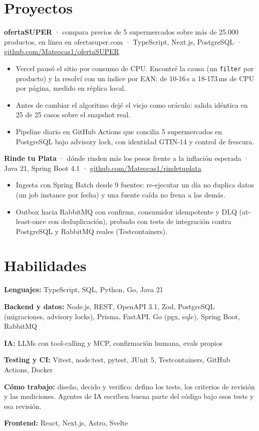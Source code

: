 \documentclass[10pt,a4paper]{article}
\newcommand{\proj}[3]{\textbf{#1} · #2 · #3\par}
\newcommand{\gh}[1]{\href{https://github.com/Mateocas1/#1}{github.com/Mateocas1/#1}}
\begin{document}
\section{Proyectos}
\proj{ofertaSUPER}{compara precios de 5 supermercados sobre más de 25.000 productos, en línea en ofertasuper.com · TypeScript, Next.js, PostgreSQL}{\gh{ofertaSUPER}}
\begin{itemize}
  \item Vercel pausó el sitio por consumo de CPU. Encontré la causa (un \texttt{filter} por producto) y la resolví con un índice por EAN: de 10-16\,s a 18-173\,ms de CPU por página, medido en réplica local.
  \item Antes de cambiar el algoritmo dejé el viejo como oráculo: salida idéntica en 25 de 25 casos sobre el snapshot real.
  \item Pipeline diario en GitHub Actions que concilia 5 supermercados en PostgreSQL bajo advisory lock, con identidad GTIN-14 y control de frescura.
\end{itemize}
\proj{Rinde tu Plata}{dónde rinden más los pesos frente a la inflación esperada · Java 21, Spring Boot 4.1}{\gh{rindetuplata}}
\begin{itemize}
  \item Ingesta con Spring Batch desde 9 fuentes: re-ejecutar un día no duplica datos (un job instance por fecha) y una fuente caída no frena a las demás.
  \item Outbox hacia RabbitMQ con confirms, consumidor idempotente y DLQ (at-least-once con deduplicación), probado con tests de integración contra PostgreSQL y RabbitMQ reales (Testcontainers).
\end{itemize}

\section{Habilidades}
\textbf{Lenguajes:} TypeScript, SQL, Python, Go, Java 21\par
\textbf{Backend y datos:} Node.js, REST, OpenAPI 3.1, Zod, PostgreSQL (migraciones, advisory locks), Prisma, FastAPI, Go (pgx, sqlc), Spring Boot, RabbitMQ\par
\textbf{IA:} LLMs con tool-calling y MCP, confirmación humana, evals propios\par
\textbf{Testing y CI:} Vitest, node:test, pytest, JUnit 5, Testcontainers, GitHub Actions, Docker\par
\textbf{Cómo trabajo:} diseño, decido y verifico: defino los tests, los criterios de revisión y las mediciones. Agentes de IA escriben buena parte del código bajo esos tests y esa revisión.\par
\textbf{Frontend:} React, Next.js, Astro, Svelte\par
\end{document}
